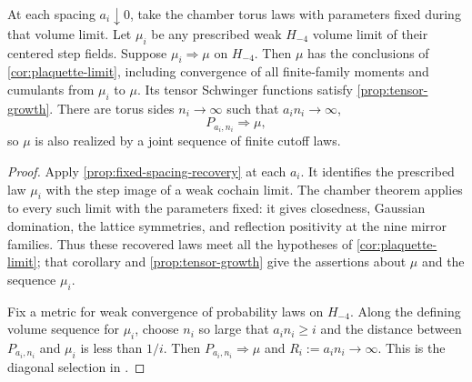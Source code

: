 \begin{corollary}\label{cor:prescribed-volume-first}
At each spacing $a_i\downarrow0$, take the chamber torus laws
with parameters fixed during that volume limit. Let $\mu_i$
be any prescribed weak $H_{-4}$ volume limit of their
centered step fields. Suppose $\mu_i\Longrightarrow\mu$ on
$H_{-4}$. Then $\mu$ has the conclusions of
\cref{cor:plaquette-limit}, including convergence of all
finite-family moments and cumulants from $\mu_i$ to $\mu$.
Its tensor Schwinger functions satisfy \cref{prop:tensor-growth}.
There are torus sides $n_i\to\infty$ such that
$a_in_i\to\infty$,
\[
 P_{a_i,n_i}\Longrightarrow\mu,
\]
so $\mu$ is also realized by a joint sequence of finite
cutoff laws.
\end{corollary}

\begin{proof}
Apply \cref{prop:fixed-spacing-recovery} at each $a_i$.
It identifies the prescribed law $\mu_i$ with the step image
of a weak cochain limit. The chamber theorem
\cite[Theorem~A]{ChamberLattice} applies to every such limit
with the parameters fixed: it gives closedness, Gaussian
domination, the lattice symmetries, and reflection positivity
at the nine mirror families. Thus these recovered laws meet
all the hypotheses of \cref{cor:plaquette-limit}; that
corollary and \cref{prop:tensor-growth} give the assertions
about $\mu$ and the sequence $\mu_i$.

Fix a metric for weak convergence of probability laws on
$H_{-4}$. Along the defining volume sequence for $\mu_i$,
choose $n_i$ so large that $a_in_i\ge i$ and the distance
between $P_{a_i,n_i}$ and $\mu_i$ is less than $1/i$.
Then $P_{a_i,n_i}\Longrightarrow\mu$ and
$R_i:=a_in_i\to\infty$. This is the diagonal selection in
\cite[proof of Proposition~6.1]{QED3Manuscript}.
\end{proof}
